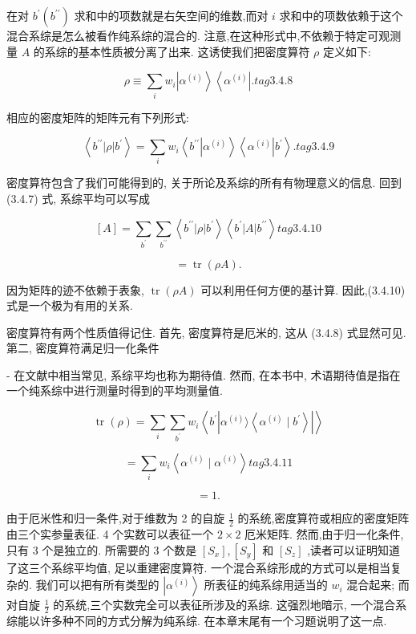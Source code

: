 在对 ${b}^{\prime }\left( {b}^{\prime \prime }\right)$ 求和中的项数就是右矢空间的维数,而对 $i$ 求和中的项数依赖于这个混合系综是怎么被看作纯系综的混合的. 注意,在这种形式中,不依赖于特定可观测量 $A$ 的系综的基本性质被分离了出来. 这诱使我们把密度算符 $\rho$ 定义如下:

$$
\rho \equiv \mathop{\sum }\limits_{i}{w}_{i}\left| {\alpha }^{\left( i\right) }\right\rangle \left\langle {\alpha }^{\left( i\right) }\right| . tag{3.4.8}
$$

相应的密度矩阵的矩阵元有下列形式:

$$
\left\langle {{b}^{\prime \prime }\left| \rho \right| {b}^{\prime }}\right\rangle = \mathop{\sum }\limits_{i}{w}_{i}\left\langle {{b}^{\prime \prime }\left| {\alpha }^{\left( i\right) }\right\rangle \left\langle {\alpha }^{\left( i\right) }\right| {b}^{\prime }}\right\rangle . tag{3.4.9}
$$

密度算符包含了我们可能得到的, 关于所论及系综的所有有物理意义的信息. 回到 (3.4.7) 式, 系综平均可以写成

$$
\left\lbrack A\right\rbrack = \mathop{\sum }\limits_{{b}^{\prime }}\mathop{\sum }\limits_{{b}^{\prime \prime }}\left\langle {{b}^{\prime \prime }\left| \rho \right| {b}^{\prime }}\right\rangle \left\langle {{b}^{\prime }\left| A\right| {b}^{\prime \prime }}\right\rangle tag{3. 4. 10}
$$

$$
= \operatorname{tr}\left( {\rho A}\right) \text{.}
$$

因为矩阵的迹不依赖于表象, $\operatorname{tr}\left( {\rho A}\right)$ 可以利用任何方便的基计算. 因此,(3.4.10) 式是一个极为有用的关系.

密度算符有两个性质值得记住. 首先, 密度算符是厄米的, 这从 (3.4.8) 式显然可见. 第二, 密度算符满足归一化条件

- 在文献中相当常见, 系综平均也称为期待值. 然而, 在本书中, 术语期待值是指在一个纯系综中进行测量时得到的平均测量值.

$$
\operatorname{tr}\left( \rho \right) = \mathop{\sum }\limits_{i}\mathop{\sum }\limits_{{b}^{\prime }}{w}_{i}\left\langle {{b}^{\prime }\left| {{\alpha }^{\left( i\right) }\rangle \left\langle {{\alpha }^{\left( i\right) } \mid {b}^{\prime }}\right\rangle }\right| }\right\rangle
$$

$$
= \mathop{\sum }\limits_{i}{w}_{i}\left\langle {{\alpha }^{\left( i\right) } \mid {\alpha }^{\left( i\right) }}\right\rangle tag{3. 4.11}
$$

$$
= 1\text{.}
$$

由于厄米性和归一条件,对于维数为 2 的自旋 $\frac{1}{2}$ 的系统,密度算符或相应的密度矩阵由三个实参量表征. 4 个实数可以表征一个 $2 \times 2$ 厄米矩阵. 然而,由于归一化条件,只有 3 个是独立的. 所需要的 3 个数是 $\left\lbrack {S}_{x}\right\rbrack ,\left\lbrack {S}_{y}\right\rbrack$ 和 $\left\lbrack {S}_{z}\right\rbrack$ ,读者可以证明知道了这三个系综平均值, 足以重建密度算符. 一个混合系综形成的方式可以是相当复杂的. 我们可以把有所有类型的 $\left| {\alpha }^{\left( i\right) }\right\rangle$ 所表征的纯系综用适当的 ${w}_{i}$ 混合起来; 而对自旋 $\frac{1}{2}$ 的系统,三个实数完全可以表征所涉及的系综. 这强烈地暗示, 一个混合系综能以许多种不同的方式分解为纯系综. 在本章末尾有一个习题说明了这一点.


